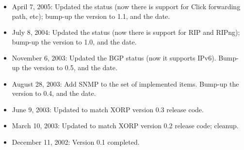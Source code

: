\documentclass[11pt]{article}
\begin{document}
\begin{itemize}

  \item April 7, 2005: Updated the status (now there is support for
  Click forwarding path, etc); bump-up the version to 1.1, and the date.

  \item July 8, 2004: Updated the status (now there is support for RIP and
  RIPng); bump-up the version to 1.0, and the date.

  \item November 6, 2003: Updated the BGP status (now it supports
  IPv6). Bump-up the version to 0.5, and the date.

  \item August 28, 2003: Add SNMP to the set of implemented items. Bump-up the
  version to 0.4, and the date.

  \item June 9, 2003: Updated to match XORP version 0.3 release code.

  \item March 10, 2003: Updated to match XORP version 0.2 release code;
  cleanup.

  \item December 11, 2002: Version 0.1 completed.

\end{itemize}





\end{document}
